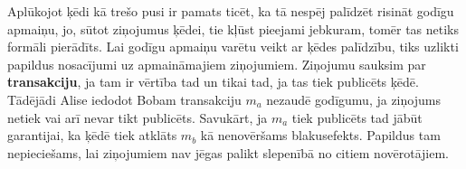 Aplūkojot ķēdi kā trešo pusi ir pamats ticēt, ka tā nespēj palīdzēt risināt godīgu apmaiņu, jo, sūtot ziņojumus ķēdei, tie kļūst pieejami jebkuram, tomēr tas netiks formāli pierādīts. Lai godīgu apmaiņu varētu veikt ar ķēdes palīdzību, tiks uzlikti papildus nosacījumi uz apmaināmajiem ziņojumiem. 
Ziņojumu sauksim par \textbf{transakciju}, ja tam ir vērtība tad un tikai tad, ja tas tiek publicēts ķēdē. Tādējādi Alise iedodot Bobam transakciju $m_a$ nezaudē godīgumu, ja ziņojums netiek vai arī nevar tikt publicēts. Savukārt, ja $m_a$ tiek publicēts tad jābūt garantijai, ka ķēdē tiek atklāts $m_b$ kā nenovēršams blakusefekts. Papildus tam nepieciešams, lai ziņojumiem nav jēgas palikt slepenībā no citiem novērotājiem.
